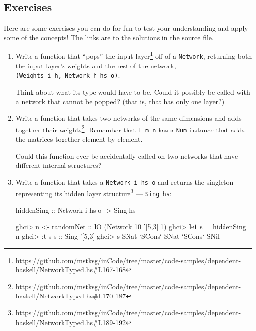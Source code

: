 \documentclass[]{article}
\newenvironment{Shaded}{}{}
\newcommand{\KeywordTok}[1]{\textcolor[rgb]{0.00,0.44,0.13}{\textbf{#1}}}
\newcommand{\DataTypeTok}[1]{\textcolor[rgb]{0.56,0.13,0.00}{#1}}
\newcommand{\DecValTok}[1]{\textcolor[rgb]{0.25,0.63,0.44}{#1}}
\newcommand{\CharTok}[1]{\textcolor[rgb]{0.25,0.44,0.63}{#1}}
\newcommand{\OtherTok}[1]{\textcolor[rgb]{0.00,0.44,0.13}{#1}}
\newcommand{\FunctionTok}[1]{\textcolor[rgb]{0.02,0.16,0.49}{#1}}
\newcommand{\NormalTok}[1]{#1}
\renewcommand{\href}[2]{#2\footnote{\url{#1}}}
\begin{document}
\subsection{Exercises}\label{exercises}

Here are some exercises you can do for fun to test your understanding and apply
some of the concepts! The links are to the solutions in the source file.

\begin{enumerate}
\def\labelenumi{\arabic{enumi}.}
\item
  Write a function that
  \href{https://github.com/mstksg/inCode/tree/master/code-samples/dependent-haskell/NetworkTyped.hs\#L167-168}{``pops''
  the input layer} off of a \texttt{Network}, returning both the input layer's
  weights and the rest of the network,
  \texttt{(Weights\ i\ h,\ Network\ h\ hs\ o)}.

  Think about what its type would have to be. Could it possibly be called with a
  network that cannot be popped? (that is, that has only one layer?)
\item
  Write a
  \href{https://github.com/mstksg/inCode/tree/master/code-samples/dependent-haskell/NetworkTyped.hs\#L170-187}{function
  that takes two networks of the same dimensions and adds together their
  weights}. Remember that \texttt{L\ m\ n} has a \texttt{Num} instance that adds
  the matrices together element-by-element.

  Could this function ever be accidentally called on two networks that have
  different internal structures?
\item
  Write a function that takes a \texttt{Network\ i\ hs\ o} and
  \href{https://github.com/mstksg/inCode/tree/master/code-samples/dependent-haskell/NetworkTyped.hs\#L189-192}{returns
  the singleton representing its hidden layer structure} --- \texttt{Sing\ hs}:

\begin{Shaded}
\begin{Highlighting}[]
\OtherTok{hiddenSing ::} \DataTypeTok{Network}\NormalTok{ i hs o }\OtherTok{->} \DataTypeTok{Sing}\NormalTok{ hs}
\end{Highlighting}
\end{Shaded}

\begin{Shaded}
\begin{Highlighting}[]
\NormalTok{ghci}\FunctionTok{>}\NormalTok{ n }\OtherTok{<- randomNet ::} \DataTypeTok{IO}\NormalTok{ (}\DataTypeTok{Network} \DecValTok{10} \CharTok{'[5,3] 1)}
\NormalTok{ghci}\FunctionTok{>} \KeywordTok{let}\NormalTok{ s }\FunctionTok{=}\NormalTok{ hiddenSing n}
\NormalTok{ghci}\FunctionTok{>} \FunctionTok{:}\NormalTok{t s}
\OtherTok{s ::} \DataTypeTok{Sing} \CharTok{'[5,3]}
\NormalTok{ghci}\FunctionTok{>}\NormalTok{ s}
\DataTypeTok{SNat} \OtherTok{`SCons`} \DataTypeTok{SNat} \OtherTok{`SCons`} \DataTypeTok{SNil}
\end{Highlighting}
\end{Shaded}
\end{enumerate}
\end{document}

